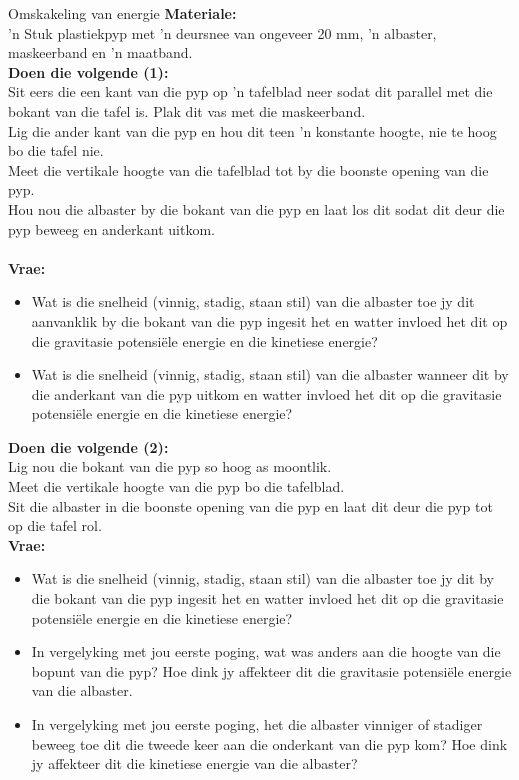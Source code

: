 \begin{activity}{Omskakeling van energie}
\textbf{Materiale:}\\
 'n Stuk plastiekpyp met  'n deursnee van ongeveer 20 mm,  'n albaster, maskeerband en  'n maatband.  \\
\textbf{Doen die volgende (1):}\\
Sit eers die een kant van die pyp op  'n tafelblad neer sodat dit parallel met die bokant van die tafel is. Plak dit vas met die maskeerband. \\
Lig die ander kant van die pyp en hou dit teen  'n konstante hoogte, nie te hoog bo die tafel nie.\\
Meet die vertikale hoogte van die tafelblad tot by die boonste opening van die pyp. \\
Hou nou die albaster by die bokant van die pyp en laat los dit sodat dit deur die pyp beweeg en anderkant uitkom.\\ \\
\textbf{Vrae:}\\ 
\begin{itemize}
\item Wat is die snelheid (vinnig, stadig, staan stil) van die albaster toe jy dit aanvanklik by die bokant van die pyp ingesit het en watter invloed het dit op die gravitasie potensiële energie en die kinetiese energie?
\item Wat is die snelheid (vinnig, stadig, staan stil) van die albaster wanneer dit by die anderkant van die pyp uitkom en watter invloed het dit op die gravitasie potensiële energie en die kinetiese energie?
\end{itemize}

\textbf{Doen die volgende (2):}\\
Lig nou die bokant van die pyp so hoog as moontlik. \\
Meet die vertikale hoogte van die pyp bo die tafelblad. \\
Sit die albaster in die boonste opening van die pyp en laat dit deur die pyp tot op die tafel rol.\\
\textbf{Vrae:}\\ 
\begin{itemize}
\item Wat is die snelheid (vinnig, stadig, staan stil) van die albaster toe jy dit by die bokant van die pyp ingesit het en watter invloed het dit op die gravitasie potensiële energie en die kinetiese energie?
\item In vergelyking met jou eerste poging, wat was anders aan die hoogte van die bopunt van die pyp? Hoe dink jy affekteer dit die gravitasie potensiële energie van die albaster.
\item In vergelyking met jou eerste poging, het die albaster vinniger of stadiger beweeg toe dit die tweede keer aan die onderkant van die pyp kom? Hoe dink jy affekteer dit die kinetiese energie van die albaster?
\end{itemize}
\end{activity}

